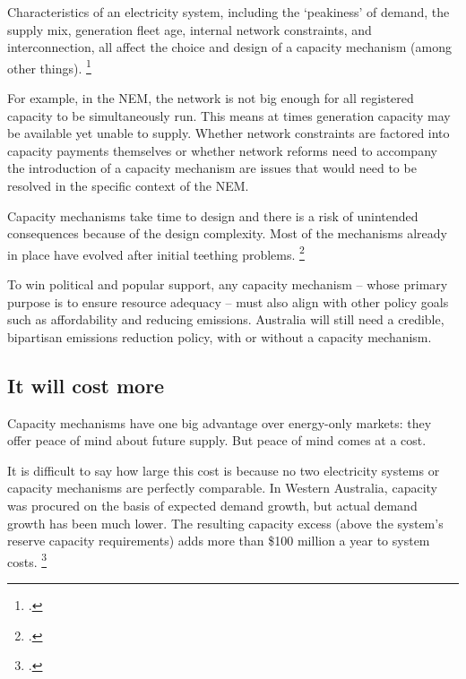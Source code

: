 \documentclass[FrontPage]{grattan}
\begin{document}
Characteristics of an electricity system, including the `peakiness' of demand, the supply mix, generation fleet age, internal network constraints, and interconnection, all affect the choice and design of a capacity mechanism (among other things).%
\footcite{CIGRE2016CapacityMechanisms}

For example, in the NEM, the network is not big enough for all registered capacity to be simultaneously run. This means at times generation capacity may be available yet unable to supply. Whether network constraints are factored into capacity payments themselves or whether network reforms need to accompany the introduction of a capacity mechanism are issues that would need to be resolved in the specific context of the NEM\@.

Capacity mechanisms take time to design and there is a risk of unintended consequences because of the design complexity. Most of the mechanisms already in place have evolved after initial teething problems.%
\footcite{CIGRE2016CapacityMechanisms}
\CenturyFootnote

To win political and popular support, any capacity mechanism -- whose primary purpose is to ensure resource adequacy -- must also align with other policy goals such as affordability and reducing emissions. Australia will still need a credible, bipartisan emissions reduction policy, with or without a capacity mechanism.


\subsection{It will cost more}\label{subsec:a-capacity-mechanism-will-cost-more} 
Capacity mechanisms have one big advantage over energy-only markets: they offer peace of mind about future supply. But peace of mind comes at a cost.

It is difficult to say how large this cost is because no two electricity systems or capacity mechanisms are perfectly comparable. In Western Australia, capacity was procured on the basis of expected demand growth, but actual demand growth has been much lower. The resulting capacity excess (above the system's reserve capacity requirements) adds more than \$100 million a year to system costs.%
\footcite{WAFinance2016CapacityMechanismReview}
\end{document}
